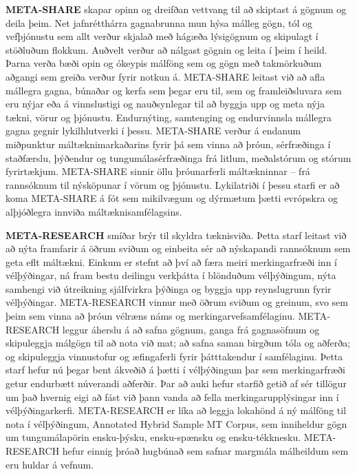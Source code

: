 \begin{multicols}{2}
\textbf{META-SHARE} skapar opinn og dreifðan vettvang til að skiptast á gögnum og deila þeim. Net jafnrétthárra gagnabrunna mun hýsa málleg gögn, tól og vefþjónustu sem allt verður skjalað með hágæða lýsigögnum og skipulagt í stöðluðum flokkum. Auðvelt verður að nálgast gögnin og leita í þeim í heild. Þarna verða bæði opin og ókeypis málföng sem og gögn með takmörkuðum aðgangi sem greiða verður fyrir notkun á. META-SHARE leitast við að afla mállegra gagna, búnaðar og kerfa sem þegar eru til, sem og framleiðsluvara sem eru nýjar eða á vinnslustigi og nauðsynlegar til að byggja upp og meta nýja tækni, vörur og þjónustu. Endurnýting, samtenging og endurvinnsla mállegra gagna gegnir lykilhlutverki í þessu. META-SHARE verður á endanum miðpunktur máltæknimarkaðarins fyrir þá sem vinna að þróun, sérfræðinga í staðfærslu, þýðendur og tungumálasérfræðinga frá litlum, meðalstórum og stórum fyrirtækjum. META-SHARE sinnir öllu þróunarferli máltækninnar -- frá rannsóknum til nýsköpunar í vörum og þjónustu. Lykilatriði í þessu starfi er að koma META-SHARE á fót sem mikilvægum og dýrmætum þætti evrópskra og alþjóðlegra innviða máltæknisamfélagsins. 

\textbf{META-RESEARCH} smíðar brýr til skyldra tæknisviða. Þetta starf leitast við að nýta framfarir á öðrum sviðum og einbeita sér að nýskapandi rannsóknum sem geta eflt máltækni. Einkum er stefnt að því að færa meiri merkingarfræði inn í vélþýðingar, ná fram bestu deilingu verkþátta í blönduðum vélþýðingum, nýta samhengi við útreikning sjálfvirkra þýðinga og byggja upp reynslugrunn fyrir vélþýðingar. META-RESEARCH vinnur með öðrum sviðum og greinum, svo sem þeim sem vinna að þróun vélræns náms og merkingarvefsamfélaginu. META-RESEARCH leggur áherslu á að safna gögnum, ganga frá gagnasöfnum og skipuleggja málgögn til að nota við mat; að safna saman birgðum tóla og aðferða; og skipuleggja vinnustofur og æfingaferli fyrir þátttakendur í samfélaginu. Þetta starf hefur nú þegar bent ákveðið á þætti í vélþýðingum þar sem merkingarfræði getur endurbætt núverandi aðferðir. Þar að auki hefur starfið getið af sér tillögur um það hvernig eigi að fást við þann vanda að fella merkingarupplýsingar inn í vélþýðingarkerfi. META-RESEARCH er líka að leggja lokahönd á ný málföng til nota í vélþýðingum, Annotated Hybrid Sample MT Corpus, sem inniheldur gögn um tungumálapörin ensku-þýsku, ensku-spænsku og ensku-tékknesku. META-RESEARCH hefur einnig þróað hugbúnað sem safnar margmála málheildum sem eru huldar á vefnum.
\end{multicols}

